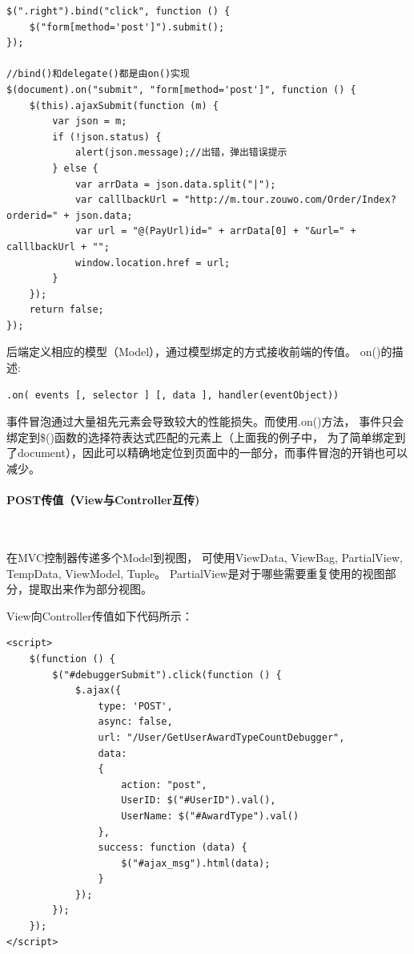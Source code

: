 \documentclass{book}
\begin{document}
\begin{lstlisting}[language=VBScript]
$(".right").bind("click", function () {
    $("form[method='post']").submit();
});

//bind()和delegate()都是由on()实现
$(document).on("submit", "form[method='post']", function () {
    $(this).ajaxSubmit(function (m) {
        var json = m;
        if (!json.status) {
            alert(json.message);//出错，弹出错误提示
        } else {
            var arrData = json.data.split("|");
            var calllbackUrl = "http://m.tour.zouwo.com/Order/Index?orderid=" + json.data;
            var url = "@(PayUrl)id=" + arrData[0] + "&url=" + calllbackUrl + "";
            window.location.href = url;
        }
    });
    return false;
});
\end{lstlisting}

后端定义相应的模型（Model），通过模型绑定的方式接收前端的传值。
on()的描述:

\begin{lstlisting}[language=VBScript]
.on( events [, selector ] [, data ], handler(eventObject))
\end{lstlisting}

事件冒泡通过大量祖先元素会导致较大的性能损失。而使用.on()方法，
事件只会绑定到\$()函数的选择符表达式匹配的元素上（上面我的例子中，
为了简单绑定到了document），因此可以精确地定位到页面中的一部分，而事件冒泡的开销也可以减少。

\paragraph{POST传值（View与Controller互传)}~

在MVC控制器传递多个Model到视图，
可使用ViewData, ViewBag, PartialView, TempData, ViewModel, Tuple。
PartialView是对于哪些需要重复使用的视图部分，提取出来作为部分视图。

View向Controller传值如下代码所示：

\begin{lstlisting}
<script>
    $(function () {
        $("#debuggerSubmit").click(function () {               
            $.ajax({
                type: 'POST',
                async: false,
                url: "/User/GetUserAwardTypeCountDebugger",
                data: 
                {
                    action: "post",
                    UserID: $("#UserID").val(),
                    UserName: $("#AwardType").val()
                },
                success: function (data) {
                    $("#ajax_msg").html(data);
                }
            });
        });
    });
</script>
\end{lstlisting}
\end{document}
